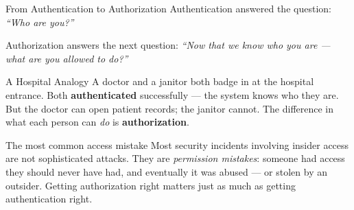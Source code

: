 \documentclass[aspectratio=169]{beamer}  %
\begin{document}
\begin{frame}{From Authentication to Authorization}
    \footnotesize
    Authentication answered the question: \emph{``Who are you?''}

    Authorization answers the next question: \emph{``Now that we know who you are --- what are you allowed to do?''}

    \vspace{0.5em}
    \begin{exampleblock}{A Hospital Analogy}
        \footnotesize
        A doctor and a janitor both badge in at the hospital entrance. Both \textbf{authenticated} successfully --- the system knows who they are. But the doctor can open patient records; the janitor cannot. The difference in what each person can \emph{do} is \textbf{authorization}.
    \end{exampleblock}

    \vspace{0.4em}
    \begin{alertblock}{The most common access mistake}
        \footnotesize
        Most security incidents involving insider access are not sophisticated attacks. They are \emph{permission mistakes}: someone had access they should never have had, and eventually it was abused --- or stolen by an outsider. Getting authorization right matters just as much as getting authentication right.
    \end{alertblock}
\end{frame}
\end{document}
